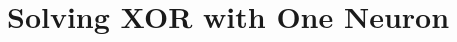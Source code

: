 
\chapter{Solving XOR with One Neuron}




% 


% 
% 
% 
% 
% 


\printbibliography[heading=subbibliography]


